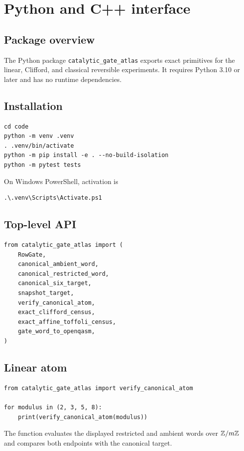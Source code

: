 \chapter{Python and C++ interface}\label{app:api}


\section{Package overview}
The Python package \texttt{catalytic\_gate\_atlas} exports exact primitives for the linear, Clifford, and classical reversible experiments.  It requires Python 3.10 or later and has no runtime dependencies.

\section{Installation}
\begin{lstlisting}[style=pythonstyle]
cd code
python -m venv .venv
. .venv/bin/activate
python -m pip install -e . --no-build-isolation
python -m pytest tests
\end{lstlisting}
On Windows PowerShell, activation is
\begin{verbatim}
.\.venv\Scripts\Activate.ps1
\end{verbatim}

\section{Top-level API}
\begin{lstlisting}[style=pythonstyle]
from catalytic_gate_atlas import (
    RowGate,
    canonical_ambient_word,
    canonical_restricted_word,
    canonical_six_target,
    snapshot_target,
    verify_canonical_atom,
    exact_clifford_census,
    exact_affine_toffoli_census,
    gate_word_to_openqasm,
)
\end{lstlisting}

\section{Linear atom}
\begin{lstlisting}[style=pythonstyle]
from catalytic_gate_atlas import verify_canonical_atom

for modulus in (2, 3, 5, 8):
    print(verify_canonical_atom(modulus))
\end{lstlisting}
The function evaluates the displayed restricted and ambient words over $\mathbb Z/m\mathbb Z$ and compares both endpoints with the canonical target.


